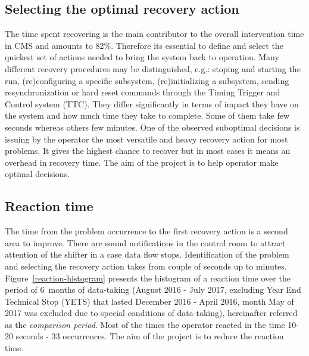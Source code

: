 \documentclass[a4paper]{jpconf}
\begin{document}
\subsection{Selecting the optimal recovery action}
The time spent recovering is the main contributor to the overall intervention time in CMS and amounts to 82\%. Therefore its essential to define and select the quickest set of actions needed to bring the system back to operation. Many different recovery procedures may be distinguished, e.g.: stoping and starting the run, (re)configuring a specific subsystem, (re)initializing a subsystem, sending resynchronization or hard reset commands through the Timing Trigger and Control system (TTC). They differ significantly in terms of impact they have on the system and how much time they take to complete. Some of them take few seconds whereas others few minutes. One of the observed suboptimal decisions is issuing by the operator the most versatile and heavy recovery action for most problems. It gives the highest chance to recover but in most cases it means an overhead in recovery time. The aim of the project is to help operator make optimal decisions.

\subsection{Reaction time} \label{reaction-section}
The time from the problem occurrence to the first recovery action is a second area to improve. There are sound notifications in the control room to attract attention of the shifter in a case data flow stops. Identification of the problem and selecting the recovery action takes from couple of seconds up to minutes. Figure~\ref{reaction-histogram} presents the histogram of a reaction time over the period of 6~months of data-taking (August 2016 - July 2017, excluding Year End Technical Stop (YETS) that lasted December 2016 - April 2016, month May of 2017 was excluded due to special conditions of data-taking), hereinafter referred as the {\it comparison period}. Most of the times the operator reacted in the time 10-20 seconds - 33 occurrences. The aim of the project is to reduce the reaction time.
\end{document}
